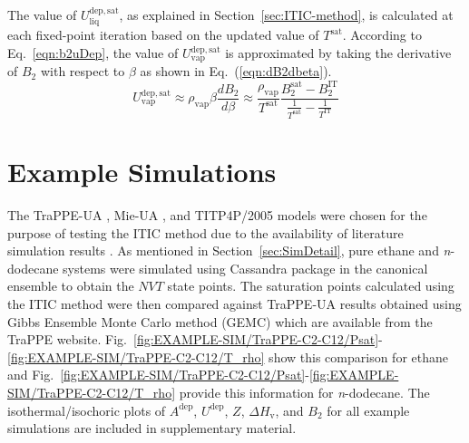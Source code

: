 \documentclass[5p,times]{elsarticle}
\begin{document}
The value of $U^{\mathrm{dep, sat}}_\mathrm{liq}$, as explained in Section~\ref{sec:ITIC-method}, is calculated at each fixed-point iteration based on the updated value of $T^{\mathrm{sat}}$. According to Eq.~\ref{eqn:b2uDep}, the value of $U^{\mathrm{dep, sat}}_\mathrm{vap}$ is approximated by taking the derivative of $B_2$ with respect to $\beta$ as shown in Eq.~(\ref{eqn:dB2dbeta}).
\begin{equation}
U^{\mathrm{dep, sat}}_\mathrm{vap}\approx \rho_{\mathrm{vap}} \beta \frac{dB_2}{d\beta} \approx \frac{\rho_{\mathrm{vap}}}{T^{\mathrm{sat}}} \frac{B_2^{\mathrm{sat}}-B_2^{\mathrm{IT}}}{\frac{1}{T^{\mathrm{sat}}} - \frac{1}{T^{\mathrm{IT}}}}
\label{eqn:dB2dbeta}
\end{equation}

\section{Example Simulations} \label{sec:ExampleSim}
The TraPPE-UA \cite{Martin1998,Martin1999,Wick2000}, Mie-UA \cite{Potoff2009,Mick2017,Barhaghi2017,Mick2015}, and TITP4P/2005 \cite{Abascal2005} models were chosen for the purpose of testing the ITIC method due to the availability of literature simulation results \cite{Martin1998,eggimann2014,Potoff2009,Shen2008}. As mentioned in Section~\ref{sec:SimDetail}, pure ethane and \textit{n}-dodecane systems were simulated using Cassandra package \cite{Shah2017} in the canonical ensemble to obtain the $NVT$ state points. The saturation points calculated using the ITIC method were then compared against TraPPE-UA results obtained using Gibbs Ensemble Monte Carlo method (GEMC) which are available from the TraPPE website.\cite{eggimann2014} Fig.~\ref{fig:EXAMPLE-SIM/TraPPE-C2-C12/Psat}-\ref{fig:EXAMPLE-SIM/TraPPE-C2-C12/T_rho} show this comparison for ethane and Fig.~\ref{fig:EXAMPLE-SIM/TraPPE-C2-C12/Psat}-\ref{fig:EXAMPLE-SIM/TraPPE-C2-C12/T_rho} provide this information for \textit{n}-dodecane. The isothermal/isochoric plots of $A^{\mathrm{dep}}$, $U^{\mathrm{dep}}$, $Z$, $\Delta H_{\mathrm{v}}$, and $B_2$ for all example simulations are included in supplementary material. 
\end{document}
